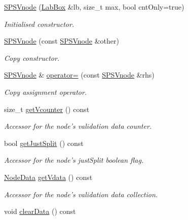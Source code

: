 \begin{DoxyCompactItemize}
\hyperlink{classsubpavings_1_1SPSVnode_a0652f353916bda77708ed26053a21789}{\-S\-P\-S\-Vnode} (\hyperlink{classLabBox}{\-Lab\-Box} \&lb, size\-\_\-t max, bool cnt\-Only=true)
\begin{DoxyCompactList}\small\item\em \-Initialised constructor. \end{DoxyCompactList}\item 
\hyperlink{classsubpavings_1_1SPSVnode_ac34ad69da8e0f3894b74f4027de2614b}{\-S\-P\-S\-Vnode} (const \hyperlink{classsubpavings_1_1SPSVnode}{\-S\-P\-S\-Vnode} \&other)
\begin{DoxyCompactList}\small\item\em \-Copy constructor. \end{DoxyCompactList}\item 
\hyperlink{classsubpavings_1_1SPSVnode}{\-S\-P\-S\-Vnode} \& \hyperlink{classsubpavings_1_1SPSVnode_ad4e310986c60dcebb3fd3c54dab19c33}{operator=} (const \hyperlink{classsubpavings_1_1SPSVnode}{\-S\-P\-S\-Vnode} \&rhs)
\begin{DoxyCompactList}\small\item\em \-Copy assignment operator. \end{DoxyCompactList}\item 
size\-\_\-t \hyperlink{classsubpavings_1_1SPSVnode_a7d7f4ecaaf020bcb614557eba4743f6a}{get\-Vcounter} () const 
\begin{DoxyCompactList}\small\item\em \-Accessor for the node's validation data counter. \end{DoxyCompactList}\item 
bool \hyperlink{classsubpavings_1_1SPSVnode_a899334f4e1760a380a776bc38d664710}{get\-Just\-Split} () const 
\begin{DoxyCompactList}\small\item\em \-Accessor for the node's just\-Split boolean flag. \end{DoxyCompactList}\item 
\hyperlink{namespacesubpavings_af005697b49cff9ea37fc3bc9ed19da30}{\-Node\-Data} \hyperlink{classsubpavings_1_1SPSVnode_a05d47c013af462f857c6f54b20cb3404}{get\-Vdata} () const 
\begin{DoxyCompactList}\small\item\em \-Accessor for the node's validation data collection. \end{DoxyCompactList}\item 
void \hyperlink{classsubpavings_1_1SPSVnode_af7739cf5333fccbe27610cbbd1138719}{clear\-Data} () const 

\end{DoxyCompactItemize}

